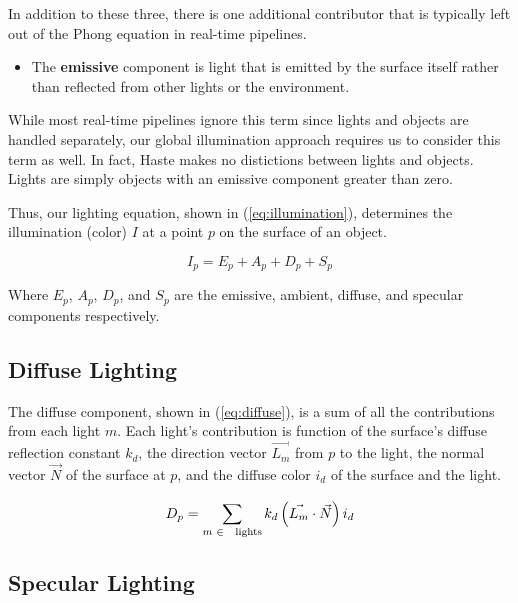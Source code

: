 \documentclass{acmsiggraph}                     %
\begin{document}
In addition to these three, there is one additional contributor that is typically
left out of the Phong equation in real-time pipelines.

\begin{itemize}
    \item The \textbf{emissive} component is light that is emitted by the surface
    itself rather than reflected from other lights or the environment.
\end{itemize}

While most real-time pipelines ignore this term since lights and objects are handled
separately, our global illumination approach requires us to consider this term as well.
In fact, Haste makes no distictions between lights and objects. Lights are simply objects
with an emissive component greater than zero.

Thus, our lighting equation, shown in (\ref{eq:illumination}), determines the illumination
(color) $I$ at a point $p$ on the surface of an object.

\begin{equation}
    \label{eq:illumination}
    I_{p} = E_{p} + A_{p} + D_{p} + S_{p}
\end{equation}

Where $E_{p}$, $A_{p}$, $D_{p}$, and $S_{p}$ are the emissive, ambient, diffuse, and
specular components respectively.

    \subsection{Diffuse Lighting}
    \label{sec:diffuse}
    
    The diffuse component, shown in (\ref{eq:diffuse}), is a sum of all the contributions
    from each light $m$. Each light's contribution is function of the surface's diffuse
    reflection constant $k_{d}$, the direction vector $\vec{L_{m}}$ from $p$ to the light,
    the normal vector $\vec{N}$ of the surface at $p$, and the diffuse color $i_{d}$ of the
    surface and the light.

    \begin{equation}
        \label{eq:diffuse}
        D_{p} = \sum_{m \textrm{ } \in \textrm{\small{ lights}}}^{}
            k_{d} \left( \vec{L_{m}} \cdot \vec{N} \right) i_{d}
    \end{equation}

    \subsection{Specular Lighting}
    \label{sec:specular}
\end{document}
